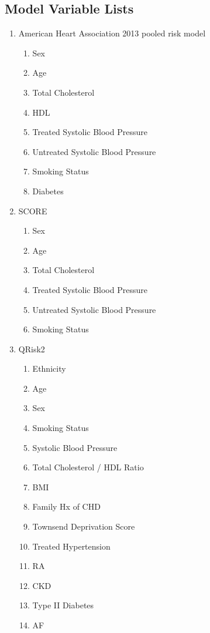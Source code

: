 \documentclass[a4paper,12pt]{article}
\begin{document}
   	\printbibliography[heading=none]
   	
   	\newpage
   	\begin{appendices}
   		
   		\section{Model Variable Lists}
   		\begin{enumerate}
   			\item American Heart Association 2013 pooled risk model
   			\begin{enumerate}
   				\item Sex
   				\item Age
   				\item Total Cholesterol
   				\item HDL
   				\item Treated Systolic Blood Pressure
   				\item Untreated Systolic Blood Pressure
   				\item Smoking Status
   				\item Diabetes
   			\end{enumerate}
   			\item SCORE
   			\begin{enumerate}
   				\item Sex
   				\item Age
   				\item Total Cholesterol
   				\item Treated Systolic Blood Pressure
   				\item Untreated Systolic Blood Pressure
   				\item Smoking Status
   			\end{enumerate}
   			\item QRisk2
   			\begin{enumerate}
   				\item Ethnicity
   				\item Age
   				\item Sex
   				\item Smoking Status
   				\item Systolic Blood Pressure
   				\item Total Cholesterol / HDL Ratio
   				\item BMI
   				\item Family Hx of CHD
   				\item Townsend Deprivation Score
   				\item Treated Hypertension
   				\item RA
   				\item CKD
   				\item Type II Diabetes
   				\item AF 
   			\end{enumerate}
   		\end{enumerate}
   		\newpage
   		

\end{appendices}
\end{document}
